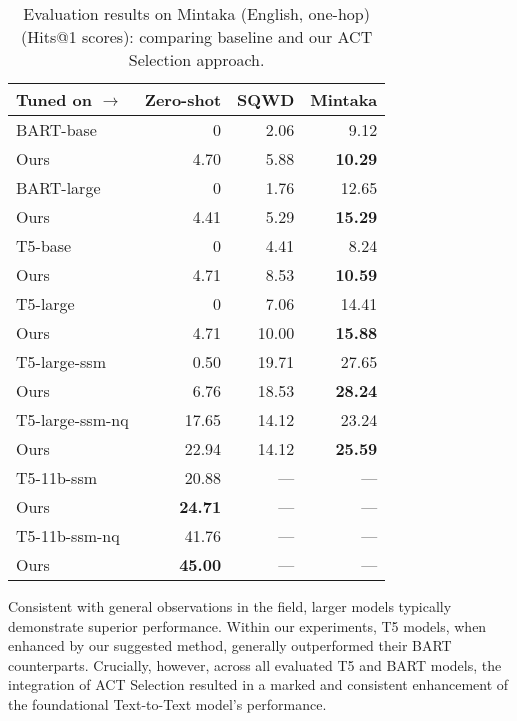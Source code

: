 \begin{table*}[ht]
    \caption{Evaluation results on Mintaka (English, one-hop) (Hits@1 scores): comparing baseline and our ACT Selection approach.}
    \label{tab:act_selection:mintaka}
    \centering
    \begin{tabular}{lrrr}
    \hline
    Tuned on $\rightarrow$ & Zero-shot & SQWD & Mintaka \\ \hline
    BART-base      & 0      & 2.06  & 9.12  \\
    Ours           & 4.70   & 5.88  & \textbf{10.29} \\ \hline
    BART-large     & 0      & 1.76  & 12.65 \\
    Ours           & 4.41   & 5.29  & \textbf{15.29} \\ \hline
    T5-base        & 0      & 4.41  & 8.24  \\
    Ours           & 4.71   & 8.53  & \textbf{10.59} \\ \hline
    T5-large       & 0      & 7.06  & 14.41 \\
    Ours           & 4.71   & 10.00 & \textbf{15.88} \\ \hline
    T5-large-ssm   & 0.50   & 19.71 & 27.65 \\
    Ours           & 6.76   & 18.53 & \textbf{28.24} \\ \hline
    T5-large-ssm-nq & 17.65 & 14.12 & 23.24 \\
    Ours           & 22.94  & 14.12 & \textbf{25.59} \\ \hline
    T5-11b-ssm     & 20.88  & ---   & ---   \\
    Ours           & \textbf{24.71} & --- & --- \\ \hline
    T5-11b-ssm-nq  & 41.76  & ---   & ---   \\
    Ours           & \textbf{45.00} & --- & --- \\ \hline
    \end{tabular}
\end{table*}



Consistent with general observations in the field, larger models typically demonstrate superior performance. Within our experiments, T5 models, when enhanced by our suggested method, generally outperformed their BART counterparts. Crucially, however, across all evaluated T5 and BART models, the integration of ACT Selection resulted in a marked and consistent enhancement of the foundational Text-to-Text model's performance.

